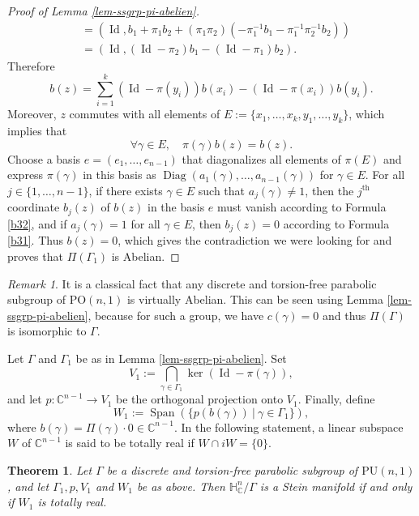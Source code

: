 \documentclass{article}
\newtheorem{theorem}{Theorem}[section]
\theoremstyle{definition}
\theoremstyle{remark}
\newtheorem*{remark}{Remark}
\newcommand{\C}{\mathbb{C}}
\newcommand{\HNC}{\mathbb{H}^{n}_{\C}}
\newcommand{\PU}{\mathrm{PU}}
\newcommand{\PO}{\mathrm{PO}}
\DeclareMathOperator{\Id}{\text{Id}}
\begin{document}
\begin{proof}[Proof of Lemma \ref{lem-ssgrp-pi-abelien}]
\begin{align*}
			&= (\Id,b_1+\pi_1b_2 +(\pi_1\pi_2)(-\pi_1^{-1}b_1 - \pi_1^{-1}\pi_2^{-1}b_2))\\
			&= (\Id,(\Id-\pi_2)b_1-(\Id-\pi_1)b_2).
		\end{align*}
		Therefore
		\begin{equation}\label{b31}
			b(z)=\sum_{i=1}^{k}(\Id-\pi(y_i))b(x_i)-(\Id-\pi(x_i))b(y_i).
		\end{equation}
		Moreover, $z$ commutes with all elements of $E:=\{x_1,\dots,x_k,y_1,\dots,y_k\}$, which implies that
		\begin{equation}\label{b32}
			\forall \gamma \in E,\quad \pi(\gamma)b(z)=b(z).
		\end{equation}
		Choose a basis $e=(e_1,\dots,e_{n-1})$ that diagonalizes all elements of $\pi(E)$ and express $\pi(\gamma)$ in this basis as $\operatorname{Diag}(a_1(\gamma),\dots,a_{n-1}(\gamma))$ for $\gamma\in E$. For all $j\in\{1,\dots,n-1\}$, if there exists $\gamma\in E$ such that $a_j(\gamma)\ne 1$, then the $j^{\text{th}}$ coordinate $b_j(z)$ of $b(z)$ in the basis $e$ must vanish according to Formula \eqref{b32}, and if $a_j(\gamma)= 1$ for all $\gamma\in E$, then $b_j(z)=0$ according to Formula \eqref{b31}. Thus $b(z)=0$, which gives the contradiction we were looking for and proves that $\Pi(\Gamma_1)$ is Abelian.
	\end{proof}
	
	\begin{remark}
		It is a classical fact that any discrete and torsion-free parabolic subgroup of $\PO(n,1)$ is virtually Abelian. This can be seen using Lemma \ref{lem-ssgrp-pi-abelien}, because for such a group, we have $c(\gamma)=0$ and thus $\Pi(\Gamma)$ is isomorphic to $\Gamma$.
	\end{remark}
	
	Let $\Gamma$ and $\Gamma_1$ be as in Lemma \ref{lem-ssgrp-pi-abelien}. Set\begin{equation*}
		V_1:= \bigcap_{\gamma\in \Gamma_1}\ker(\operatorname{Id}-\pi(\gamma)),
	\end{equation*} and let $p:\C^{n-1}\to V_1$ be the orthogonal projection onto $V_1$. Finally, define \begin{equation*}
	W_1 := \operatorname{Span}(\{p(b(\gamma)) \ \vert \ \gamma\in \Gamma_1\}),
	\end{equation*}
	where $b(\gamma)=\Pi(\gamma)\cdot 0 \in \C^{n-1}$. In the following statement, a linear subspace $W$ of $\C^{n-1}$ is said to be totally real if $W\cap iW=\{0\}$.
	
	\begin{theorem}\label{thm-caracterisation-parab-stein}
		Let $\Gamma$ be a discrete and torsion-free parabolic subgroup of $\PU(n,1)$, and let $\Gamma_1,p, V_1$ and $W_1$ be as above. Then $\HNC/\Gamma$ is a Stein manifold if and only if $W_1$ is totally real.
	\end{theorem}
		
\end{document}
